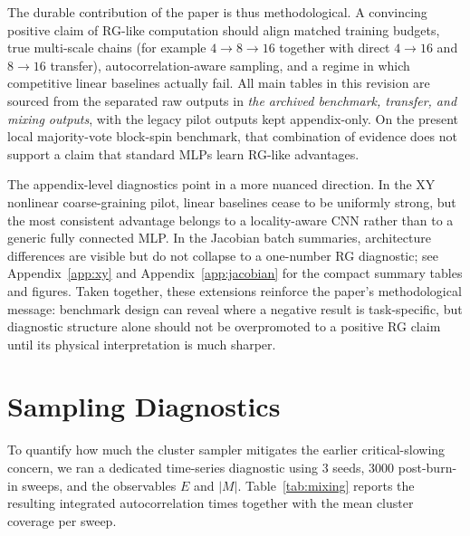 \documentclass[12pt,a4paper]{memoir}
\begin{document}
The durable contribution of the paper is thus methodological.  A convincing
positive claim of RG-like computation should align matched training budgets,
true multi-scale chains (for example $4\to8\to16$ together with direct
$4\to16$ and $8\to16$ transfer), autocorrelation-aware sampling, and a regime
in which competitive linear baselines actually fail.  All main tables in this
revision are sourced from the separated raw outputs in
\emph{the archived benchmark, transfer, and mixing outputs}, with the legacy pilot outputs kept
appendix-only.  On the present local majority-vote block-spin benchmark, that
combination of evidence does not support a claim that standard MLPs learn
RG-like advantages.

The appendix-level diagnostics point in a more nuanced direction.  In the XY
nonlinear coarse-graining pilot, linear baselines cease to be uniformly strong,
but the most consistent advantage belongs to a locality-aware CNN rather than to
a generic fully connected MLP.  In the Jacobian batch summaries, architecture
differences are visible but do not collapse to a one-number RG diagnostic; see
Appendix~\ref{app:xy} and Appendix~\ref{app:jacobian} for the compact summary
tables and figures.
Taken together, these extensions reinforce the paper's methodological message:
benchmark design can reveal where a negative result is task-specific, but
diagnostic structure alone should not be overpromoted to a positive RG claim
until its physical interpretation is much sharper.

\appendix

\section{Sampling Diagnostics}
\label{app:mixing}

To quantify how much the cluster sampler mitigates the earlier critical-slowing
concern, we ran a dedicated time-series diagnostic using 3 seeds, 3000
post-burn-in sweeps, and the observables $E$ and $|M|$.  Table~\ref{tab:mixing}
reports the resulting integrated autocorrelation times together with the mean
cluster coverage per sweep.
\end{document}
